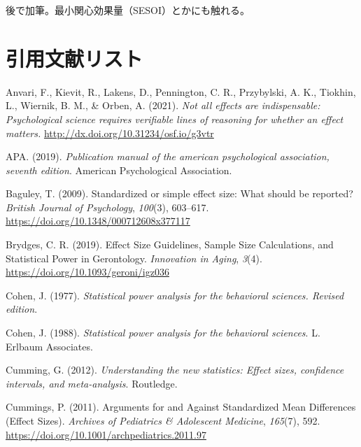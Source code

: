 \documentclass[
  ja=standard, xelatex, base=12pt]{bxjsreport}
\newlength{\cslhangindent}
\newlength{\cslentryspacingunit} %
\newenvironment{CSLReferences}[2] %
 {%
  \setlength{\parindent}{0pt}
  \ifodd #1
  \let\oldpar\par
  \def\par{\hangindent=\cslhangindent\oldpar}
  \fi
  \setlength{\parskip}{#2\cslentryspacingunit}
 }%
 {}
\begin{document}
後で加筆。最小関心効果量（SESOI）とかにも触れる。

\hypertarget{ux5f15ux7528ux6587ux732eux30eaux30b9ux30c8}{%
\chapter{引用文献リスト}\label{ux5f15ux7528ux6587ux732eux30eaux30b9ux30c8}}

\hypertarget{refs}{}
\begin{CSLReferences}{1}{0}
\leavevmode{}%
Anvari, F., Kievit, R., Lakens, D., Pennington, C. R., Przybylski, A. K., Tiokhin, L., Wiernik, B. M., \& Orben, A. (2021). \emph{Not all effects are indispensable: Psychological science requires verifiable lines of reasoning for whether an effect matters.} \url{http://dx.doi.org/10.31234/osf.io/g3vtr}

\leavevmode{}%
APA. (2019). \emph{Publication manual of the american psychological association, seventh edition}. American Psychological Association.

\leavevmode{}%
Baguley, T. (2009). Standardized or simple effect size: What should be reported? \emph{British Journal of Psychology}, \emph{100}(3), 603--617. \url{https://doi.org/10.1348/000712608x377117}

\leavevmode{}%
Brydges, C. R. (2019). Effect Size Guidelines, Sample Size Calculations, and Statistical Power in Gerontology. \emph{Innovation in Aging}, \emph{3}(4). \url{https://doi.org/10.1093/geroni/igz036}

\leavevmode{}%
Cohen, J. (1977). \emph{Statistical power analysis for the behavioral sciences. Revised edition}.

\leavevmode{}%
Cohen, J. (1988). \emph{Statistical power analysis for the behavioral sciences}. L. Erlbaum Associates.

\leavevmode{}%
Cumming, G. (2012). \emph{Understanding the new statistics: Effect sizes, confidence intervals, and meta-analysis}. Routledge.

\leavevmode{}%
Cummings, P. (2011). Arguments for and Against Standardized Mean Differences (Effect Sizes). \emph{Archives of Pediatrics \& Adolescent Medicine}, \emph{165}(7), 592. \url{https://doi.org/10.1001/archpediatrics.2011.97}


\end{CSLReferences}
\end{document}
